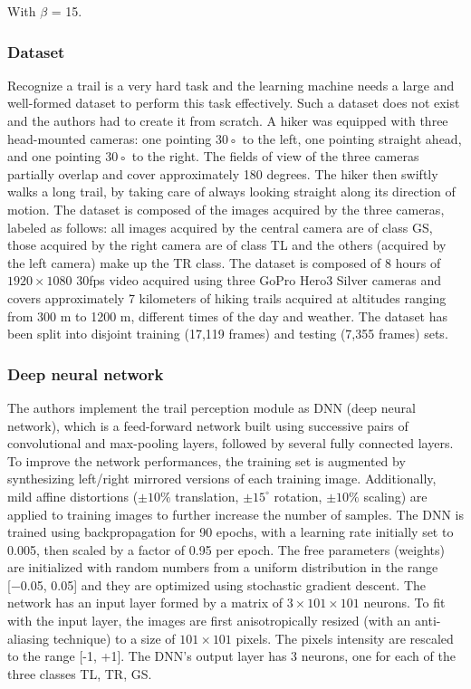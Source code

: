 With $\beta$ = 15\degree.

\subsubsection{Dataset}\label{header-n47}

Recognize a trail is a very hard task and the learning machine needs a
large and well-formed dataset to perform this task effectively. Such a
dataset does not exist and the authors had to create it from scratch. A
hiker was equipped with three head-mounted cameras: one pointing 30◦ to
the left, one pointing straight ahead, and one pointing 30◦ to the
right. The fields of view of the three cameras partially overlap and
cover approximately 180 degrees. The hiker then swiftly walks a long
trail, by taking care of always looking straight along its direction of
motion. The dataset is composed of the images acquired by the three
cameras, labeled as follows: all images acquired by the central camera
are of class GS, those acquired by the right camera are of class TL and
the others (acquired by the left camera) make up the TR class. The
dataset is composed of 8 hours of $1920 \times 1080$ 30fps video acquired using
three GoPro Hero3 Silver cameras and covers approximately 7 kilometers
of hiking trails acquired at altitudes ranging from 300 m to 1200 m,
different times of the day and weather. The dataset has been split into
disjoint training (17,119 frames) and testing (7,355 frames) sets.

\subsubsection{Deep neural network}\label{header-n55}

The authors implement the trail perception module as DNN (deep neural
network), which is a feed-forward network built using successive pairs
of convolutional and max-pooling layers, followed by several fully
connected layers. To improve the network performances, the training set
is augmented by synthesizing left/right mirrored versions of each
training image. Additionally, mild affine distortions ($\pm10\%$
translation, $\pm15^{\circ}$ rotation, $\pm10\%$ scaling) are applied to training
images to further increase the number of samples. The DNN is trained
using backpropagation for 90 epochs, with a learning rate initially set
to 0.005, then scaled by a factor of 0.95 per epoch. The free parameters
(weights) are initialized with random numbers from a uniform
distribution in the range {[}−0.05, 0.05{]} and they are optimized using
stochastic gradient descent. The network has an input layer formed by a
matrix of $3 \times 101 \times 101$ neurons. To fit with the input layer, the images
are first anisotropically resized (with an anti-aliasing technique) to a
size of $101 \times 101$ pixels. The pixels intensity are rescaled to the range
{[}-1, +1{]}. The DNN's output layer has 3 neurons, one for each of the
three classes TL, TR, GS.

